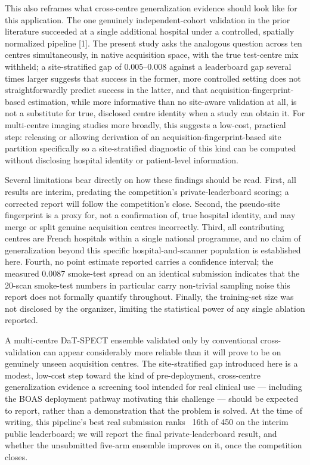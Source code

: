 \documentclass[11pt]{article}
\begin{document}
This also reframes what cross-centre generalization evidence should look like for this application. The one genuinely independent-cohort validation in the prior literature succeeded at a single additional hospital under a controlled, spatially normalized pipeline [1]. The present study asks the analogous question across ten centres simultaneously, in native acquisition space, with the true test-centre mix withheld; a site-stratified gap of 0.005--0.008 against a leaderboard gap several times larger suggests that success in the former, more controlled setting does not straightforwardly predict success in the latter, and that acquisition-fingerprint-based estimation, while more informative than no site-aware validation at all, is not a substitute for true, disclosed centre identity when a study can obtain it. For multi-centre imaging studies more broadly, this suggests a low-cost, practical step: releasing or allowing derivation of an acquisition-fingerprint-based site partition specifically so a site-stratified diagnostic of this kind can be computed without disclosing hospital identity or patient-level information.

Several limitations bear directly on how these findings should be read. First, all results are interim, predating the competition's private-leaderboard scoring; a corrected report will follow the competition's close. Second, the pseudo-site fingerprint is a proxy for, not a confirmation of, true hospital identity, and may merge or split genuine acquisition centres incorrectly. Third, all contributing centres are French hospitals within a single national programme, and no claim of generalization beyond this specific hospital-and-scanner population is established here. Fourth, no point estimate reported carries a confidence interval; the measured 0.0087 smoke-test spread on an identical submission indicates that the 20-scan smoke-test numbers in particular carry non-trivial sampling noise this report does not formally quantify throughout. Finally, the training-set size was not disclosed by the organizer, limiting the statistical power of any single ablation reported.

A multi-centre DaT-SPECT ensemble validated only by conventional cross-validation can appear considerably more reliable than it will prove to be on genuinely unseen acquisition centres. The site-stratified gap introduced here is a modest, low-cost step toward the kind of pre-deployment, cross-centre generalization evidence a screening tool intended for real clinical use --- including the BOAS deployment pathway motivating this challenge --- should be expected to report, rather than a demonstration that the problem is solved. At the time of writing, this pipeline's best real submission ranks ~16th of 450 on the interim public leaderboard; we will report the final private-leaderboard result, and whether the unsubmitted five-arm ensemble improves on it, once the competition closes.
\end{document}
